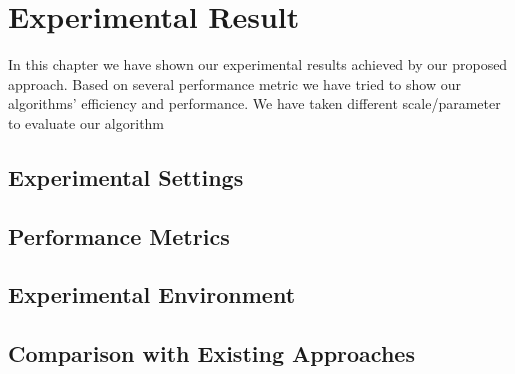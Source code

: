 \documentclass[a4paper,12pt]{book}
\begin{document}
\chapter{Experimental Result}
In this chapter we have shown our experimental results achieved by our proposed approach. Based on several performance metric we have tried to show our algorithms' efficiency and performance. We have taken different scale/parameter to evaluate our algorithm
\section{Experimental Settings}

\section{Performance Metrics}

\section{Experimental Environment}

\nopagebreak[2]
\section{Comparison with Existing Approaches}

%
\end{document}
